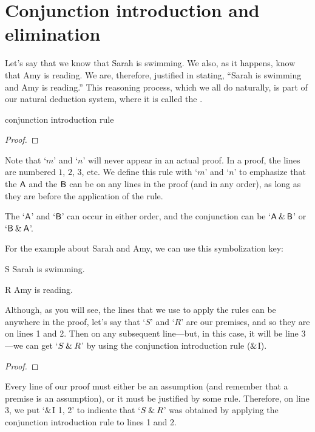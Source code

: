 \section{Conjunction introduction and elimination}\label{s:conj-rule}

Let's say that we know that Sarah is swimming. We also, as it happens, know that Amy is reading. We are, therefore, justified in stating, ``Sarah is swimming and Amy is reading.'' 
This reasoning process, which we all do naturally, is part of our natural deduction system, where it is called the . 
\begin{factboxy}{conjunction introduction rule}
\begin{proof}
	 
\end{proof}
\tcblower
\footnotesize{Note that `$m$' and `$n$' will never appear in an actual proof. In a proof, the lines are numbered $1$, $2$, $3$, etc. We define this rule with `$m$' and `$n$' to emphasize that the $\mathsf{A}$ and the $\mathsf{B}$ can be on any lines in the proof (and in any order), as long as they are before the application of the rule.}
\end{factboxy}

\noindent The `$\mathsf{A}$' and `$\mathsf{B}$' can occur in either order, and the conjunction can be `$\mathsf{A} \mathbin{\&} \mathsf{B}$' or `$\mathsf{B} \mathbin{\&} \mathsf{A}$'.

For the example about Sarah and Amy, we can use this symbolization key:
	\begin{ekey}
		\item[S] Sarah is swimming.
		\item[R] Amy is reading.
	\end{ekey}
Although, as you will see, the lines that we use to apply the rules can be anywhere in the proof, let's say that `$S$' and `$R$' are our premises, and so they are on lines 1 and 2. Then on any subsequent line---but, in this case, it will be line 3---we can get `$S \mathbin{\&} R$' by using the conjunction introduction rule ($\mathbin{\&}$I).
\begin{proof}
	 \pr{}
	 \pr{}
	 
\end{proof}

Every line of our proof must either be an assumption (and remember that a premise is an assumption), or it must be justified by some rule. Therefore, on line 3, we put `$\mathbin{\&}$I 1, 2' to indicate that `$S \mathbin{\&} R$' was obtained by applying the conjunction introduction rule to lines 1 and 2. 


